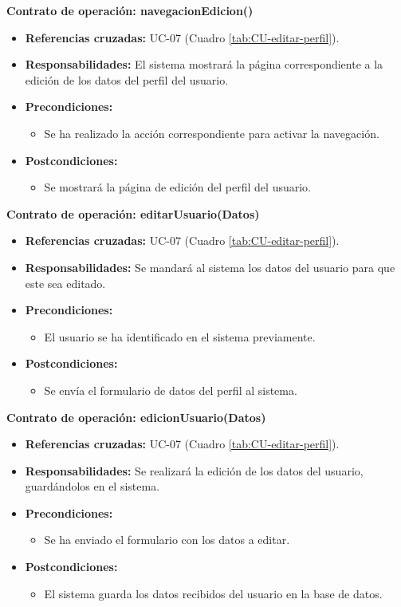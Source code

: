 \textbf{Contrato de operación: navegacionEdicion()}
\begin{itemize}
\item \textbf{Referencias cruzadas:} UC-07 (Cuadro \ref{tab:CU-editar-perfil}).
\item \textbf{Responsabilidades:} El sistema mostrará la página correspondiente a la edición de los datos del perfil del usuario.
\item \textbf{Precondiciones:} 
 \begin{itemize}
\item Se ha realizado la acción correspondiente para activar la navegación.
\end {itemize}
\item \textbf{Postcondiciones:} 
 \begin{itemize}
\item Se mostrará la página de edición del perfil del usuario.
\end {itemize}
\end {itemize}

\textbf{Contrato de operación: editarUsuario(Datos)}
\begin{itemize}
\item \textbf{Referencias cruzadas:} UC-07 (Cuadro \ref{tab:CU-editar-perfil}).
\item \textbf{Responsabilidades:} Se mandará al sistema los datos del usuario para que este sea editado.
\item \textbf{Precondiciones:} 
 \begin{itemize}
\item El usuario se ha identificado en el sistema previamente.
\end {itemize}
\item \textbf{Postcondiciones:} 
 \begin{itemize}
\item Se envía el formulario de datos del perfil al sistema.
\end {itemize}
\end {itemize}

\textbf{Contrato de operación: edicionUsuario(Datos)}
\begin{itemize}
\item \textbf{Referencias cruzadas:} UC-07 (Cuadro \ref{tab:CU-editar-perfil}).
\item \textbf{Responsabilidades:} Se realizará la edición de los datos del usuario, guardándolos en el sistema.
\item \textbf{Precondiciones:} 
 \begin{itemize}
\item Se ha enviado el formulario con los datos a editar.
\end {itemize}
\item \textbf{Postcondiciones:} 
 \begin{itemize}
\item El sistema guarda los datos recibidos del usuario en la base de datos.
\end {itemize}
\end {itemize}

